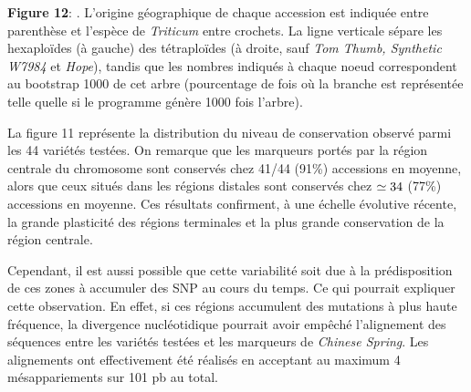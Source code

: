 \documentclass[a4paper, 12pt]{article}
\begin{document}
\begin{onehalfspace}
\begin{center}
\end{center}
\vspace{-1.5cm}
\textbf{Figure 12}: . L'origine géographique de chaque accession est indiquée entre parenthèse et l'espèce de \textit{Triticum} entre crochets. La ligne verticale sépare les hexaploïdes (à gauche) des tétraploïdes (à droite, sauf \textit{Tom Thumb, Synthetic W7984} et \textit{Hope}), tandis que les nombres indiqués à chaque noeud correspondent au bootstrap 1000 de cet arbre (pourcentage de fois où la branche est représentée telle quelle si le programme génère 1000 fois l'arbre).\\
\vfill
\addtocounter{page}{-1}
\newpage

La figure 11 représente la distribution du niveau de conservation observé parmi les 44 variétés testées. On remarque que les marqueurs portés par la région centrale du chromosome sont conservés chez 41/44 (91\%) accessions en moyenne, alors que ceux situés dans les régions distales sont conservés chez $\begin{simeq}34\end{simeq}$ (77\%) accessions en moyenne. Ces résultats confirment, à une échelle évolutive récente, la grande plasticité des régions terminales et la plus grande conservation de la région centrale.

Cependant, il est aussi possible que cette variabilité soit due à la prédisposition de ces zones à accumuler des SNP au cours du temps. Ce qui pourrait expliquer cette observation. En effet, si ces régions accumulent des mutations à plus haute fréquence, la divergence nucléotidique pourrait avoir empêché l'alignement des séquences entre les variétés testées et les marqueurs de \textit{Chinese Spring}. Les alignements ont effectivement été réalisés en acceptant au maximum 4 mésappariements sur 101 pb au total.\\


\end{onehalfspace}
\end{document}
